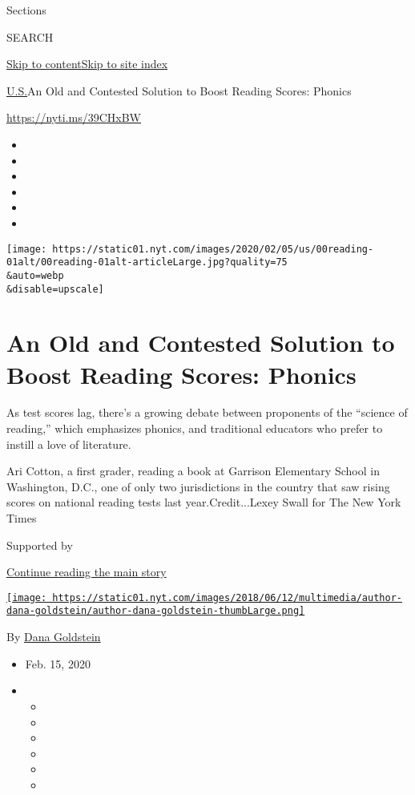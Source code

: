 Sections

SEARCH

\protect\hyperlink{site-content}{Skip to
content}\protect\hyperlink{site-index}{Skip to site index}

\href{/section/us}{U.S.}\textbar{}An Old and Contested Solution to Boost
Reading Scores: Phonics

\url{https://nyti.ms/39CHxBW}

\begin{itemize}
\item
\item
\item
\item
\item
\item
\end{itemize}

\texttt{[image: https://static01.nyt.com/images/2020/02/05/us/00reading-01alt/00reading-01alt-articleLarge.jpg?quality=75\\\&auto=webp\\\&disable=upscale]}

\hypertarget{an-old-and-contested-solution-to-boost-reading-scores-phonics}{%
\section{An Old and Contested Solution to Boost Reading Scores:
Phonics}\label{an-old-and-contested-solution-to-boost-reading-scores-phonics}}

As test scores lag, there's a growing debate between proponents of the
``science of reading,'' which emphasizes phonics, and traditional
educators who prefer to instill a love of literature.

Ari Cotton, a first grader, reading a book at Garrison Elementary School
in Washington, D.C., one of only two jurisdictions in the country that
saw rising scores on national reading tests last year.Credit...Lexey
Swall for The New York Times

Supported by

\protect\hyperlink{after-sponsor}{Continue reading the main story}

\href{https://www.nytimes.com/by/dana-goldstein}{\texttt{[image: https://static01.nyt.com/images/2018/06/12/multimedia/author-dana-goldstein/author-dana-goldstein-thumbLarge.png]}}

By \href{https://www.nytimes.com/by/dana-goldstein}{Dana Goldstein}

\begin{itemize}
\item
  Feb. 15, 2020
\item
  \begin{itemize}
  \item
  \item
  \item
  \item
  \item
  \item
  \end{itemize}
\end{itemize}

